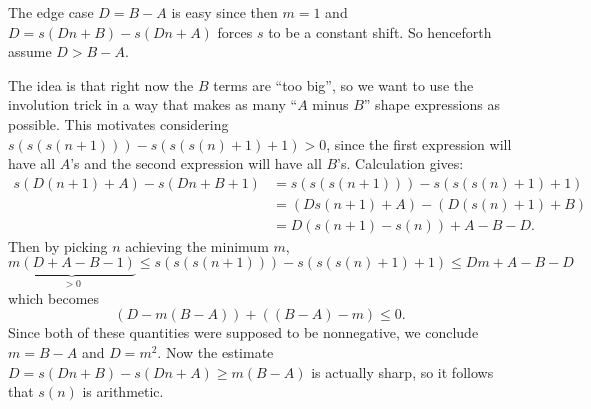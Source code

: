 The edge case $D = B-A$ is easy since then $m=1$
and $D = s(Dn+B)-s(Dn+A)$ forces $s$ to be a constant shift.
So henceforth assume $D > B-A$.

The idea is that right now the $B$ terms are ``too big'',
so we want to use the involution trick in a way that makes as many
``$A$ minus $B$'' shape expressions as possible.
This motivates considering $s(s(s(n+1))) - s(s(s(n)+1)+1) > 0$,
since the first expression will have all $A$'s
and the second expression will have all $B$'s.
Calculation gives:
\begin{align*}
  s(D(n+1)+A) - s(Dn+B+1)
  &= \boxed{s(s(s(n+1))) - s(s(s(n)+1)+1)} \\
  &= (Ds(n+1) + A) - (D(s(n)+1) + B) \\
  &= D\left( s(n+1)-s(n) \right) + A-B-D.
\end{align*}
Then by picking $n$ achieving the minimum $m$,
\[ \underbrace{m(D+A-B-1)}_{>0} \le s(s(s(n+1))) - s(s(s(n)+1)+1) \le Dm + A-B-D \]
which becomes
\[ \left( D-m(B-A) \right) + \left( (B-A)-m \right) \le 0. \]
Since both of these quantities were supposed to be nonnegative,
we conclude $m = B-A$ and $D = m^2$.
Now the estimate $D = s(Dn+B) - s(Dn+A) \ge m(B-A)$ is actually sharp,
so it follows that $s(n)$ is arithmetic.

